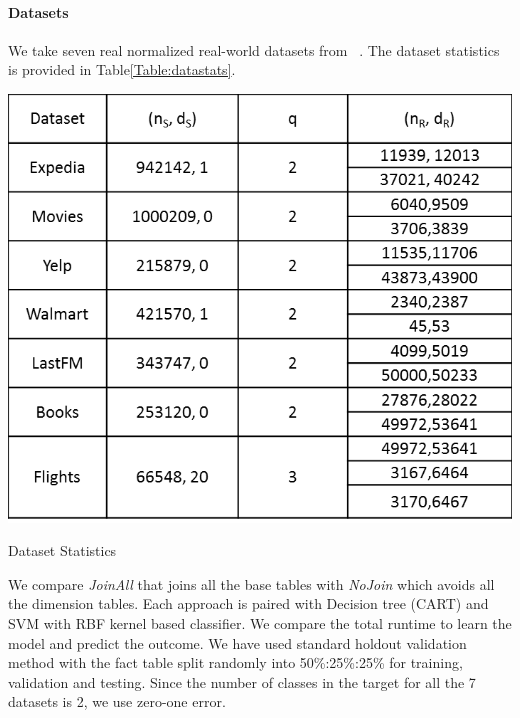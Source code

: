 \documentclass[sigconf]{acmart}
\begin{document}
\paragraph*{Datasets}
We take seven real normalized real-world datasets from ~\cite{arun}. The dataset statistics is provided in Table\ref{Table:datastats}.
\begin{table}
\centering
\includegraphics[width=\columnwidth,height=\textheight,keepaspectratio]{table1.png}
\caption{Dataset Statistics}
\label{Table:datastats}
\end{table}
We compare \textit{JoinAll} that joins all the base tables with \textit{NoJoin} which avoids all the dimension tables. Each approach is paired with Decision tree (CART) and SVM with RBF kernel based classifier. We compare the total runtime to learn the model and predict the outcome. We have used standard holdout validation method with the fact table split randomly into 50\%:25\%:25\% for training, validation and testing. Since the number of classes in the target for all the 7 datasets is 2, we use zero-one error. 
\end{document}
